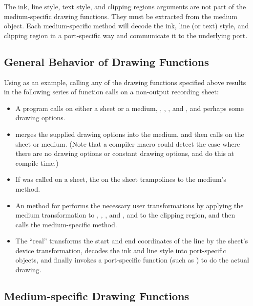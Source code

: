 The ink, line style, text style, and clipping regions arguments are not part of
the medium-specific drawing functions.  They must be extracted from the medium
object.  Each medium-specific method will decode the ink, line (or text) style,
and clipping region in a port-specific way and communicate it to the underlying
port.


\subsection {General Behavior of Drawing Functions}

Using  as an example, calling any of the drawing functions
specified above results in the following series of function calls on a
non-output recording sheet:

\begin{itemize} 
\item A program calls  on either a sheet or a medium, ,
, , and , and perhaps some drawing options.

\item {} merges the supplied drawing options into the medium, and
then calls  on the sheet or medium.  (Note that a compiler
macro could detect the case where there are no drawing options or constant
drawing options, and do this at compile time.)

\item If  was called on a sheet, the  on
the sheet trampolines to the medium's  method.

\item An  method for  performs the necessary
user transformations by applying the medium transformation to ,
, , and , and to the clipping region, and then calls the
medium-specific method.

\item The ``real''  transforms the start and end
coordinates of the line by the sheet's device transformation, decodes the ink
and line style into port-specific objects, and finally invokes a port-specific
function (such as ) to do the actual drawing.
\end{itemize}


\subsection {Medium-specific Drawing Functions}

